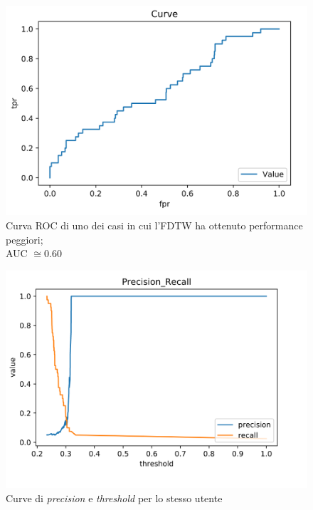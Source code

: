 \documentclass[8pt,notitlepage]{report}
\begin{document}
			\begin{figure}[H]
				\begin{center}
					\includegraphics[scale=.35]{ROC_FDTW_Dario}
					\caption{Curva ROC di uno dei casi in cui l'FDTW ha ottenuto performance peggiori;\\ AUC $ \cong 0.60 $}
				\end{center}
			\end{figure}
			
			\begin{figure}[H]
				\begin{center}
					\includegraphics[scale=.35]{precision_recall_FDTW_Dario}
					\caption{Curve di \textit{precision} e \textit{threshold} per lo stesso utente}
				\end{center}
			\end{figure}
			
\end{document}
